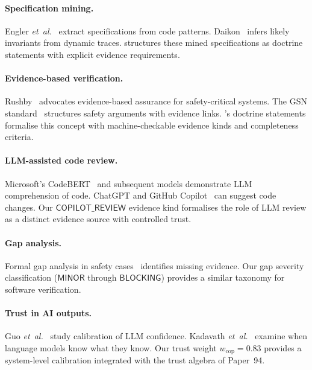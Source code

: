 \documentclass[11pt]{article}
\newcommand{\CopRev}{\mathsf{COPILOT\_REVIEW}}
\newcommand{\copweight}{w_{\mathrm{cop}}}
\begin{document}
\paragraph{Specification mining.}
Engler \emph{et~al.}~\cite{engler2001bugs} extract specifications from code
patterns.  Daikon~\cite{ernst2007daikon} infers likely invariants from
dynamic traces.  \JuGeo{} structures these mined specifications as doctrine
statements with explicit evidence requirements.

\paragraph{Evidence-based verification.}
Rushby~\cite{rushby2015interpretation} advocates evidence-based assurance for
safety-critical systems.  The GSN standard~\cite{gsn2011standard} structures
safety arguments with evidence links.  \JuGeo's doctrine statements
formalise this concept with machine-checkable evidence kinds and completeness
criteria.

\paragraph{LLM-assisted code review.}
Microsoft's CodeBERT~\cite{feng2020codebert} and subsequent models
demonstrate LLM comprehension of code.  ChatGPT and GitHub
Copilot~\cite{chen2021evaluating} can suggest code changes.  Our $\CopRev$
evidence kind formalises the role of LLM review as a distinct evidence source
with controlled trust.

\paragraph{Gap analysis.}
Formal gap analysis in safety cases~\cite{hawkins2011new} identifies missing
evidence.  Our gap severity classification ($\mathsf{MINOR}$ through
$\mathsf{BLOCKING}$) provides a similar taxonomy for software verification.

\paragraph{Trust in AI outputs.}
Guo \emph{et~al.}~\cite{guo2023trust} study calibration of LLM confidence.
Kadavath \emph{et~al.}~\cite{kadavath2022language} examine when language
models know what they know.  Our trust weight $\copweight = 0.83$ provides
a system-level calibration integrated with the trust algebra of Paper~94.

\end{document}

